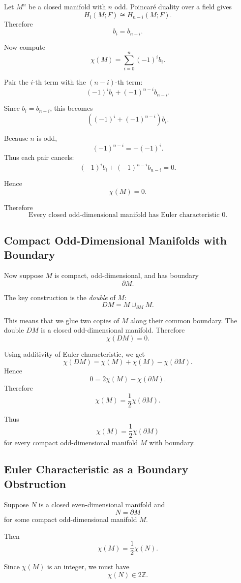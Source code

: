 \documentclass[12pt,a4paper]{article}
\theoremstyle{notespace}
\begin{document}
Let \(M^n\) be a closed manifold with \(n\) odd. Poincar\'e duality over a field
gives
\[
H_i(M;F)\cong H_{n-i}(M;F).
\]
Therefore
\[
b_i=b_{n-i}.
\]

Now compute
\[
\chi(M)=\sum_{i=0}^n(-1)^i b_i.
\]

Pair the \(i\)-th term with the \((n-i)\)-th term:
\[
(-1)^i b_i+(-1)^{n-i}b_{n-i}.
\]

Since \(b_i=b_{n-i}\), this becomes
\[
\left((-1)^i+(-1)^{n-i}\right)b_i.
\]

Because \(n\) is odd,
\[
(-1)^{n-i}=-(-1)^i.
\]
Thus each pair cancels:
\[
(-1)^i b_i+(-1)^{n-i}b_{n-i}=0.
\]

Hence
\[
\chi(M)=0.
\]

Therefore
\[
\boxed{
	\text{Every closed odd-dimensional manifold has Euler characteristic }0.
}
\]

\subsection{Compact Odd-Dimensional Manifolds with Boundary}

Now suppose \(M\) is compact, odd-dimensional, and has boundary
\[
\partial M.
\]

The key construction is the \emph{double} of \(M\):
\[
DM=M\cup_{\partial M}M.
\]

This means that we glue two copies of \(M\) along their common boundary. The
double \(DM\) is a closed odd-dimensional manifold. Therefore
\[
\chi(DM)=0.
\]

Using additivity of Euler characteristic, we get
\[
\chi(DM)=\chi(M)+\chi(M)-\chi(\partial M).
\]
Hence
\[
0=2\chi(M)-\chi(\partial M).
\]
Therefore
\[
\chi(M)=\frac{1}{2}\chi(\partial M).
\]

Thus
\[
\boxed{
	\chi(M)=\frac12\chi(\partial M)
}
\]
for every compact odd-dimensional manifold \(M\) with boundary.

\subsection{Euler Characteristic as a Boundary Obstruction}

Suppose \(N\) is a closed even-dimensional manifold and
\[
N=\partial M
\]
for some compact odd-dimensional manifold \(M\).

Then
\[
\chi(M)=\frac12\chi(N).
\]

Since \(\chi(M)\) is an integer, we must have
\[
\chi(N)\in 2\mathbb Z.
\]
\end{document}
